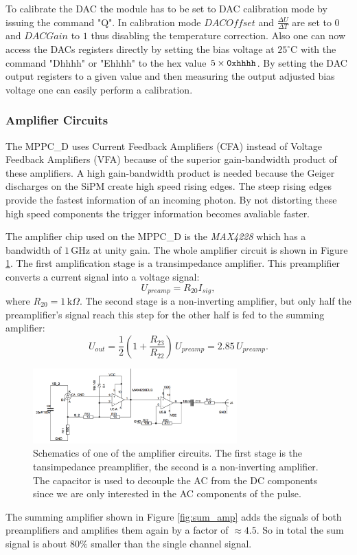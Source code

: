 \documentclass[]{article}
\begin{document}
To calibrate the DAC the module has to be set to DAC calibration mode by issuing the command "Q". In calibration mode $DACOffset$ and $\frac{\Delta U}{\Delta T}$ 
are set to $0$ and $DACGain$ to $1$ thus disabling the temperature correction. Also one can now access the DACs registers directly by setting the bias voltage 
at $25^{\circ} \text{C}$ with the command "Dhhhh" or "Ehhhh" to the hex value $5\times\verb|0xhhhh|$. By setting the DAC output registers to a given value and then measuring the 
output adjusted bias voltage one can easily perform a calibration.

\subsubsection{Amplifier Circuits}

The MPPC\_D uses Current Feedback Amplifiers (CFA) instead of Voltage Feedback Amplifiers (VFA) because of the superior gain-bandwidth product of these amplifiers. A high 
gain-bandwidth product is needed because the Geiger discharges on the SiPM create high speed rising edges. The steep rising edges provide the fastest information of an incoming photon. 
By not distorting these high speed components the trigger information becomes avaliable faster.

The amplifier chip used on the MPPC\_D is the \emph{MAX4228} which has a bandwidth of $1\,\text{GHz}$ at unity gain. The whole amplifier circuit is shown in Figure \ref{fig:amp_cir}. 
The first amplification stage is a transimpedance amplifier. This preamplifier converts a current signal into a voltage signal:
\begin{equation}
	U_{preamp} = R_{20} I_{sig},
\end{equation}
where $R_{20} = 1\,\text{k}\Omega$. The second stage is a non-inverting amplifier, but only half the preamplifier's signal reach this step for the other half is fed to the summing amplifier:
\begin{equation}
	U_{out} = \frac{1}{2} (1 + \frac{R_{23}}{R_{22}}) \, U_{preamp} = 2.85 \, U_{preamp}.
\end{equation}

	\begin{figure}[t]
		\centering
			\includegraphics[width=0.7\textwidth]{Figures/weinstock/amplifier_circuit.png}
		\caption{Schematics of one of the amplifier circuits. The first stage is the tansimpedance preamplifier, the second is a non-inverting amplifier. The capacitor is used to decouple the AC from the DC components since we are only interested in the AC components of the pulse.}
		\label{fig:amp_cir}
	\end{figure}	
The summing amplifier shown in Figure \ref{fig:sum_amp} adds the signals of both preamplifiers and amplifies them again by a factor of $\approx4.5$. So in total the sum signal is about $80\%$ smaller than the single channel signal.
\end{document}
